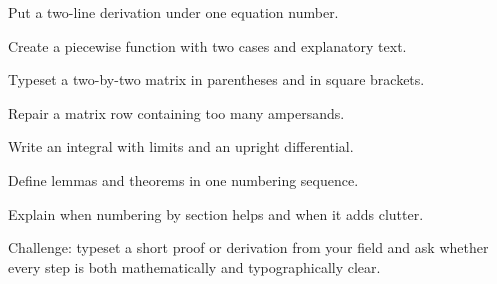 \chapterexercisestitle
\begin{chapterexercises}
  \item Put a two-line derivation under one equation number.
  \item Create a piecewise function with two cases and explanatory text.
  \item Typeset a two-by-two matrix in parentheses and in square brackets.
  \item Repair a matrix row containing too many ampersands.
  \item Write an integral with limits and an upright differential.
  \item Define lemmas and theorems in one numbering sequence.
  \item Explain when numbering by section helps and when it adds clutter.
  \item Challenge: typeset a short proof or derivation from your field and ask
        whether every step is both mathematically and typographically clear.
\end{chapterexercises}

